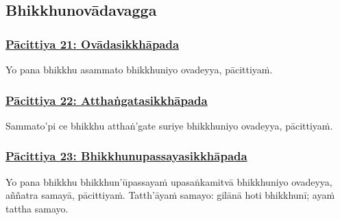 \subsection{Bhikkhunovādavagga}
\label{pc-vagga3}

\subsubsection*{\hyperref[exp21]{Pācittiya 21: Ovādasikkhāpada}}
\label{pac21}

Yo pana bhikkhu asammato bhikkhuniyo ovadeyya, pācittiyaṁ.



\subsubsection*{\hyperref[exp22]{Pācittiya 22: Atthaṅgatasikkhāpada}}
\label{pac22}

Sammato'pi\makeatletter\hyperlink{endnote264-appendix}\makeatother{} ce bhikkhu atthaṅ'gate suriye\makeatletter\hyperlink{endnote265-appendix}\makeatother{} bhikkhuniyo ovadeyya, pācittiyaṁ.



\subsubsection*{\hyperref[exp23]{Pācittiya 23: Bhikkhunupassayasikkhāpada}}
\label{pac23}

Yo pana bhikkhu bhikkhun'ūpassayaṁ\makeatletter\hyperlink{endnote266-appendix}\makeatother{} upasaṅkamitvā bhikkhuniyo ovadeyya, aññatra samayā, pācittiyaṁ. Tatth'āyaṁ samayo: gilānā\makeatletter\hyperlink{endnote267-appendix}\makeatother{} hoti bhikkhunī; ayaṁ tattha samayo.



